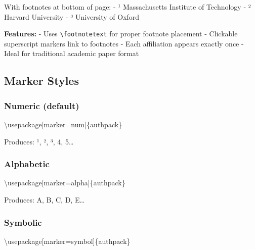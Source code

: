 \documentclass[
]{article}
\newenvironment{Shaded}{}{}
\newcommand{\BuiltInTok}[1]{#1}
\newcommand{\ExtensionTok}[1]{#1}
\newcommand{\NormalTok}[1]{#1}
\begin{document}
With footnotes at bottom of page: - ¹ Massachusetts Institute of
Technology - ² Harvard University - ³ University of Oxford

\textbf{Features:} - Uses \texttt{\textbackslash{}footnotetext} for
proper footnote placement - Clickable superscript markers link to
footnotes - Each affiliation appears exactly once - Ideal for
traditional academic paper format

\hypertarget{marker-styles}{%
\subsection{Marker Styles}\label{marker-styles}}

\hypertarget{numeric-default}{%
\subsubsection{Numeric (default)}\label{numeric-default}}

\begin{Shaded}
\begin{Highlighting}[]
\BuiltInTok{\textbackslash{}usepackage}\NormalTok{[marker=num]\{}\ExtensionTok{authpack}\NormalTok{\}}
\end{Highlighting}
\end{Shaded}

Produces: ¹, ², ³, 4, 5\ldots{}

\hypertarget{alphabetic}{%
\subsubsection{Alphabetic}\label{alphabetic}}

\begin{Shaded}
\begin{Highlighting}[]
\BuiltInTok{\textbackslash{}usepackage}\NormalTok{[marker=alpha]\{}\ExtensionTok{authpack}\NormalTok{\}}
\end{Highlighting}
\end{Shaded}

Produces: A, B, C, D, E\ldots{}

\hypertarget{symbolic}{%
\subsubsection{Symbolic}\label{symbolic}}

\begin{Shaded}
\begin{Highlighting}[]
\BuiltInTok{\textbackslash{}usepackage}\NormalTok{[marker=symbol]\{}\ExtensionTok{authpack}\NormalTok{\}}
\end{Highlighting}
\end{Shaded}
\end{document}
